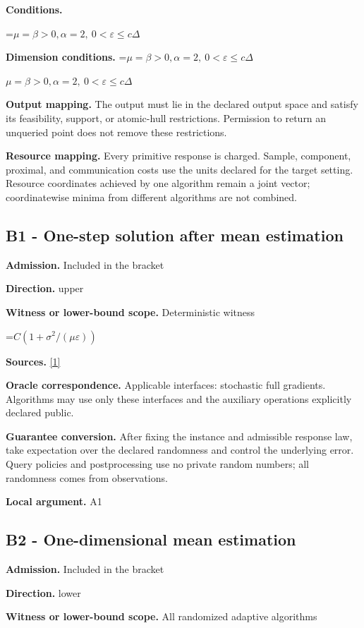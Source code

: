\documentclass[10pt,a4paper]{article}
\newcommand{\AtlasMath}[1]{\par\begingroup\centering\setbox0=\hbox{$\displaystyle #1$}\ifdim\wd0>1.4\linewidth\typeout{ATLAS WIDE FORMULA: \the\wd0}\fi\ifdim\wd0>\linewidth\resizebox{\linewidth}{!}{\box0}\else\box0\fi\par\endgroup}
\newcommand{\AtlasInlineMath}[1]{\begingroup\setbox0=\hbox{$#1$}\ifdim\wd0>.4\linewidth\endgroup\AtlasMath{#1}\else\endgroup$#1$\fi}
\begin{document}
\textbf{Conditions.} 
\AtlasMath{\mu=\beta>0,\alpha=2,\ 0<\varepsilon\le c\Delta}


\textbf{Dimension conditions.} \AtlasInlineMath{\mu=\beta>0,\alpha=2,\ 0<\varepsilon\le c\Delta}

\textbf{Output mapping.} The output must lie in the declared output space and satisfy its feasibility, support, or atomic-hull restrictions. Permission to return an unqueried point does not remove these restrictions.

\textbf{Resource mapping.} Every primitive response is charged. Sample, component, proximal, and communication costs use the units declared for the target setting. Resource coordinates achieved by one algorithm remain a joint vector; coordinatewise minima from different algorithms are not combined.

\subsection{B1 - One-step solution after mean estimation}
\textbf{Admission.} Included in the bracket

\textbf{Direction.} upper

\textbf{Witness or lower-bound scope.} Deterministic witness

\AtlasMath{C(1+\sigma^2/(\mu\varepsilon))}
\textbf{Sources.} \href{https://proceedings.mlr.press/v202/sadiev23a/sadiev23a.pdf}{[1]}

\textbf{Oracle correspondence.} Applicable interfaces: stochastic full gradients. Algorithms may use only these interfaces and the auxiliary operations explicitly declared public.

\textbf{Guarantee conversion.} After fixing the instance and admissible response law, take expectation over the declared randomness and control the underlying error. Query policies and postprocessing use no private random numbers; all randomness comes from observations.

\textbf{Local argument.} A1

\subsection{B2 - One-dimensional mean estimation}
\textbf{Admission.} Included in the bracket

\textbf{Direction.} lower

\textbf{Witness or lower-bound scope.} All randomized adaptive algorithms
\end{document}
